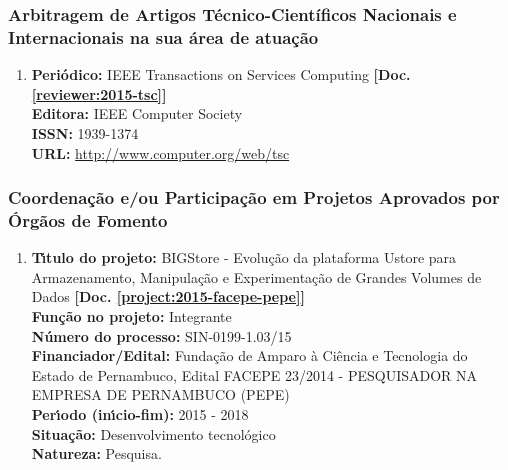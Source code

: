 \documentclass[a4paper,oneside,10pt]{article}
\begin{document}
\subsubsection{Arbitragem de Artigos Técnico-Científicos Nacionais e Internacionais na sua área de atuação}
\vspace{0.3cm}

\begin{enumerate}
\renewcommand{\labelenumi}{{\large\bfseries\arabic{enumi}.}}

\item   \textbf{Peri\'{o}dico:} IEEE Transactions on Services Computing \textbf{[Doc. \ref{reviewer:2015-tsc}]}\\
        \textbf{Editora:} IEEE Computer Society\\
        \textbf{ISSN:} 1939-1374\\
        \textbf{URL:} \url{http://www.computer.org/web/tsc}

\end{enumerate}

\subsubsection{Coordena\c{c}\~{a}o e/ou Participa\c{c}\~{a}o em Projetos Aprovados por \'{O}rg\~{a}os de Fomento}
\vspace{0.3cm}

\begin{enumerate}
\renewcommand{\labelenumi}{{\large\bfseries\arabic{enumi}.}}

\item \textbf{T\'{\i}tulo do projeto:} BIGStore - Evolução da plataforma Ustore para Armazenamento, Manipulação e Experimentação de Grandes Volumes de Dados \textbf{[Doc. \ref{project:2015-facepe-pepe}]}\\
      \textbf{Fun\c{c}\~{a}o no projeto:} Integrante\\
      \textbf{N\'{u}mero do processo:} SIN-0199-1.03/15\\
      \textbf{Financiador/Edital:} Fundação de Amparo à Ciência e Tecnologia do Estado de Pernambuco, Edital FACEPE 23/2014 - PESQUISADOR NA EMPRESA DE PERNAMBUCO (PEPE)\\
      \textbf{Per\'{\i}odo (in\'{\i}cio-fim):} 2015 - 2018\\
      \textbf{Situação:} Desenvolvimento tecnológico\\
      \textbf{Natureza:} Pesquisa.

\end{enumerate}
\end{document}

